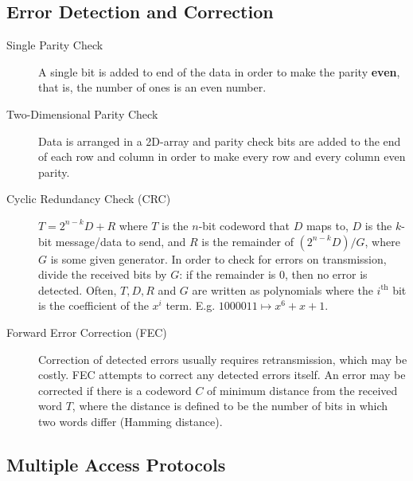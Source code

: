 \documentclass{article}
\begin{document}
\subsection*{Error Detection and Correction}

\begin{description}
    \item[Single Parity Check] A single bit is added to end of the data in order to make the parity
    \textbf{even}, that is, the number of ones is an even number.
    
    \item[Two-Dimensional Parity Check] Data is arranged in a 2D-array and parity check bits are added
    to the end of each row and column in order to make every row and every column even parity.
    
    \item[Cyclic Redundancy Check (CRC)] $T=2^{n-k}D+R$ where $T$ is the $n$-bit codeword that $D$
    maps to, $D$ is the $k$-bit message/data to send, and $R$ is the remainder of $(2^{n-k}D)/G$, 
    where $G$ is some given generator. In order to check for errors on transmission, divide the received bits 
    by $G$: if the remainder is $0$, then no error is detected. Often, $T,D,R$ and $G$ are written 
    as polynomials where the $i^\text{th}$ bit is the coefficient of the $x^i$ term.
    E.g. $1000011\mapsto x^6+x+1.$ 
    
    \item[Forward Error Correction (FEC)] Correction of detected errors usually requires retransmission,
    which may be costly. FEC attempts to correct any detected errors itself. An error may be corrected
    if there is a codeword $C$ of minimum distance from the received word $T$, where the distance is
    defined to be the number of bits in which two words differ (Hamming distance).
\end{description}

\subsection*{Multiple Access Protocols}
\end{document}
